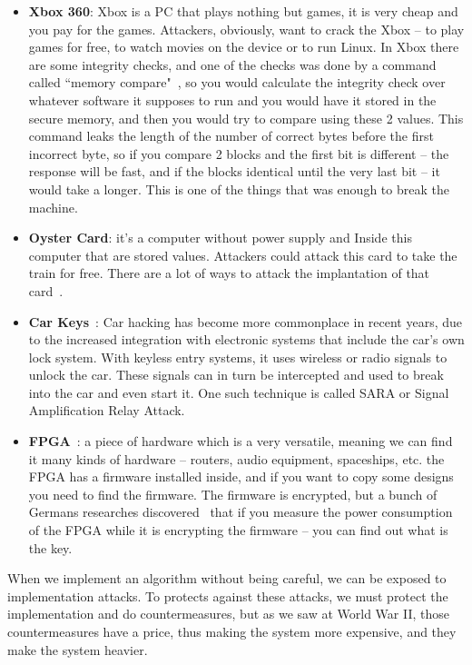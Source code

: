 \begin{itemize}
    \item \textbf{Xbox 360}: Xbox is a PC that plays nothing but games, it is
    very cheap and you pay for the games. Attackers, obviously, want to crack
    the Xbox – to play games for free, to watch movies on the device or to run
    Linux. In Xbox there are some integrity checks, and one of the checks was
    done by a command called ``memory compare"~\cite{memcmp}, so you would
    calculate the integrity check over whatever software it supposes to run and
    you would have it stored in the secure memory, and then you would try to
    compare using these 2 values. This command leaks the length of the number of
    correct bytes before the first incorrect byte, so if you compare 2 blocks
    and the first bit is different – the response will be fast, and if the
    blocks identical until the very last bit – it would take a longer. This is
    one of the things that was enough to break the machine. 
    \item \textbf{Oyster Card}: it's a computer without power supply and Inside
    this computer that are stored values. Attackers could attack this card to
    take the train for free. There are a lot of ways to attack the implantation
    of that card~\cite{garcia2008dismantling, courtois2008algebraic}.
    \item \textbf{Car Keys}~: Car hacking has become more commonplace in recent years, due to the increased integration with electronic systems that include the car’s own lock system.
    With keyless entry systems, it uses wireless or radio signals to unlock the car.
    These signals can in turn be intercepted and used to break into the car and even start it.
    One such technique is called SARA or Signal Amplification Relay Attack. \cite{relayAttack}
    \item \textbf{FPGA}~\cite{fpga}: a piece of hardware which is a very
    versatile, meaning we can find it many kinds of hardware – routers, audio
    equipment, spaceships, etc. the FPGA has a firmware installed inside, and if
    you want to copy some designs you need to find the firmware. The firmware is
    encrypted, but a bunch of Germans researches
    discovered~\cite{moradi2011vulnerability} that if you measure the power
    consumption of the FPGA while it is encrypting the firmware – you can find
    out what is the key.
\end{itemize}

When we implement an algorithm without being careful, we can be exposed to
implementation attacks. To protects against these attacks, we must protect the
implementation and do countermeasures, but as we saw at World War II, those
countermeasures have a price, thus making the system more expensive, and they
make the system heavier.

